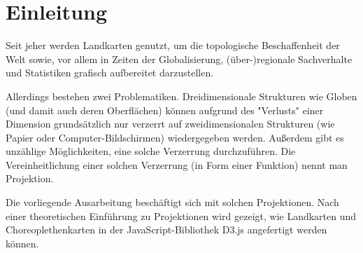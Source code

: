 
\chapter{Einleitung}
\label{ch:introduction}

Seit jeher werden Landkarten genutzt, um die topologische Beschaffenheit der Welt sowie, vor allem in Zeiten der Globalisierung, (über-)regionale Sachverhalte und Statistiken grafisch aufbereitet darzustellen.

Allerdings bestehen zwei Problematiken. Dreidimensionale Strukturen wie Globen (und damit auch deren Oberflächen) können aufgrund des "Verlusts" einer Dimension grundsätzlich nur verzerrt auf zweidimensionalen Strukturen (wie Papier oder Computer-Bildschirmen) wiedergegeben werden. Außerdem gibt es unzählige Möglichkeiten, eine solche Verzerrung durchzuführen. Die Vereinheitlichung einer solchen Verzerrung (in Form einer Funktion) nennt man Projektion.

Die vorliegende Ausarbeitung beschäftigt sich mit solchen Projektionen. Nach einer theoretischen Einführung zu Projektionen wird gezeigt, wie Landkarten und Choreoplethenkarten in der JavaScript-Bibliothek D3.js angefertigt werden können.